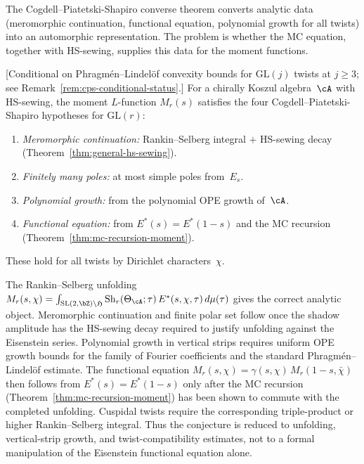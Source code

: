 The Cogdell--Piatetski-Shapiro converse theorem converts
analytic data (meromorphic continuation, functional equation,
polynomial growth for all twists) into an automorphic
representation. The problem is whether the MC equation, together with
HS-sewing, supplies this data for the moment functions.

\begin{conjecture}%
\label{conj:cps-from-mc}%
\ClaimStatusConjectured%
%
\textup{[}Conditional on Phragm\'en--Lindel\"of convexity bounds
for $\mathrm{GL}(j)$ twists at $j \geq 3$;
see Remark~\textup{\ref{rem:cps-conditional-status}}.\textup{]}
For a chirally Koszul algebra~$\cA$ with HS-sewing, the moment
$L$-function $M_r(s)$ satisfies the four
Cogdell--Piatetski-Shapiro hypotheses for
$\mathrm{GL}(r)$\textup{:}
\begin{enumerate}[label=\textup{(\alph*)}]
\item \emph{Meromorphic continuation:}
 Rankin--Selberg integral $+$ HS-sewing decay
 \textup{(}Theorem~\textup{\ref{thm:general-hs-sewing}}\textup{)}.
\item \emph{Finitely many poles:}
 at most simple poles from~$E_s$.
\item \emph{Polynomial growth:}
 from the polynomial OPE growth of~$\cA$.
\item \emph{Functional equation:}
 from $E^*(s) = E^*(1{-}s)$ and the MC recursion
 \textup{(}Theorem~\textup{\ref{thm:mc-recursion-moment}}\textup{)}.
\end{enumerate}
These hold for all twists by Dirichlet characters~$\chi$.
\end{conjecture}

\begin{remark}
The Rankin--Selberg unfolding
$M_r(s,\chi) = \int_{\mathrm{SL}(2,\bZ)\backslash\mathfrak{H}}
\operatorname{Sh}_r(\Theta_\cA;\tau)\,E^*(s,\chi,\tau)\,
d\mu(\tau)$
gives the correct analytic object. Meromorphic continuation and
finite polar set follow once the shadow amplitude has the
HS-sewing decay required to justify unfolding against the Eisenstein
series. Polynomial growth in vertical strips requires uniform OPE
growth bounds for the family of Fourier coefficients and the
standard Phragm\'en--Lindel\"of estimate. The functional equation
$M_r(s,\chi) = \gamma(s,\chi)\,M_r(1{-}s,\bar\chi)$
then follows from $E^*(s)=E^*(1-s)$ only after the MC recursion
\textup{(}Theorem~\textup{\ref{thm:mc-recursion-moment}}\textup{)}
has been shown to commute with the completed unfolding. Cuspidal
twists require the corresponding triple-product or higher
Rankin--Selberg integral. Thus the conjecture is reduced to
unfolding, vertical-strip growth, and twist-compatibility estimates,
not to a formal manipulation of the Eisenstein functional equation
alone.
\end{remark}

